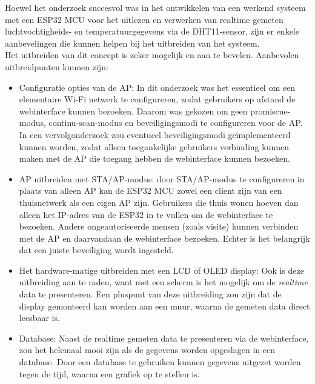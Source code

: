 Hoewel het onderzoek succesvol was in het ontwikkelen van een werkend systeem met een ESP32 MCU 
voor het uitlezen en verwerken van realtime gemeten luchtvochtigheids- en temperatuurgegevens via de DHT11-sensor, 
zijn er enkele aanbevelingen die kunnen helpen bij het uitbreiden van het systeem. 
\\
Het uitbreiden van dit concept is zeker mogelijk en aan te bevelen. 
Aanbevolen uitbreidpunten kunnen zijn:
\begin{itemize}
    \item Configuratie opties van de AP: In dit onderzoek was het essentieel om een elementaire Wi-Fi netwerk te configureren, zodat gebruikers op afstand de webinterface kunnen bezoeken. 
Daarom was gekozen om geen promiscue-modus, continu-scan-modus en beveiligingsmodi te configureren voor de AP. 
In een vervolgonderzoek zou eventueel beveiligingsmodi geïmplementeerd kunnen worden, zodat alleen toegankelijke gebruikers verbinding kunnen maken met de AP die toegang hebben de webinterface kunnen bezoeken. 

    \item AP uitbreiden met STA/AP-modus: door STA/AP-modus te configureren in plaats van alleen AP kan de ESP32 MCU zowel een client zijn van een thuisnetwerk als een eigen AP zijn. 
Gebruikers die thuis wonen hoeven dan alleen het IP-adres van de ESP32 in te vullen om de webinterface te bezoeken. 
Andere ongeautoriseerde mensen (zoals visite) kunnen verbinden met de AP en daarvandaan de webinterface bezoeken. 
Echter is het belangrijk dat een juiste beveiliging wordt ingesteld. 
    \item Het hardware-matige uitbreiden met een LCD of OLED display: Ook is deze uitbreiding aan te raden, want met een scherm is het mogelijk om de \textit{realtime} data te presenteren. 
Een pluspunt van deze uitbreiding zou zijn dat de display gemonteerd kan worden aan een muur, waarna de gemeten data direct leesbaar is. 
    \item Database: Naast de realtime gemeten data te presenteren via de webinterface, zou het helemaal mooi zijn als de gegevens worden opgeslagen in een database. 
Door een database te gebruiken kunnen gegevens uitgezet worden tegen de tijd, waarna een grafiek op te stellen is. 
\end{itemize} 